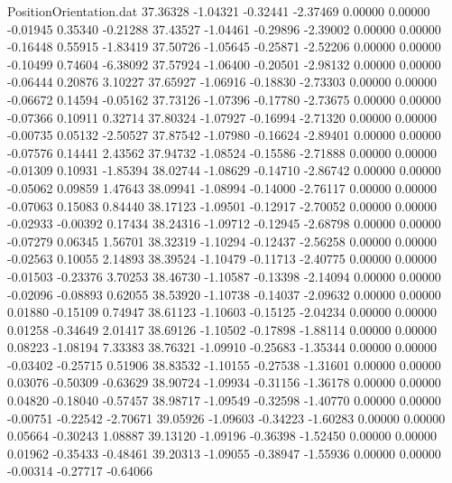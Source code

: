 \begin{filecontents}{PositionOrientation.dat}
  37.36328   -1.04321   -0.32441    -2.37469    0.00000    0.00000   -0.01945    0.35340   -0.21288
  37.43527   -1.04461   -0.29896    -2.39002    0.00000    0.00000   -0.16448    0.55915   -1.83419
  37.50726   -1.05645   -0.25871    -2.52206    0.00000    0.00000   -0.10499    0.74604   -6.38092
  37.57924   -1.06400   -0.20501    -2.98132    0.00000    0.00000   -0.06444    0.20876    3.10227
  37.65927   -1.06916   -0.18830    -2.73303    0.00000    0.00000   -0.06672    0.14594   -0.05162
  37.73126   -1.07396   -0.17780    -2.73675    0.00000    0.00000   -0.07366    0.10911    0.32714
  37.80324   -1.07927   -0.16994    -2.71320    0.00000    0.00000   -0.00735    0.05132   -2.50527
  37.87542   -1.07980   -0.16624    -2.89401    0.00000    0.00000   -0.07576    0.14441    2.43562
  37.94732   -1.08524   -0.15586    -2.71888    0.00000    0.00000   -0.01309    0.10931   -1.85394
  38.02744   -1.08629   -0.14710    -2.86742    0.00000    0.00000   -0.05062    0.09859    1.47643
  38.09941   -1.08994   -0.14000    -2.76117    0.00000    0.00000   -0.07063    0.15083    0.84440
  38.17123   -1.09501   -0.12917    -2.70052    0.00000    0.00000   -0.02933   -0.00392    0.17434
  38.24316   -1.09712   -0.12945    -2.68798    0.00000    0.00000   -0.07279    0.06345    1.56701
  38.32319   -1.10294   -0.12437    -2.56258    0.00000    0.00000   -0.02563    0.10055    2.14893
  38.39524   -1.10479   -0.11713    -2.40775    0.00000    0.00000   -0.01503   -0.23376    3.70253
  38.46730   -1.10587   -0.13398    -2.14094    0.00000    0.00000   -0.02096   -0.08893    0.62055
  38.53920   -1.10738   -0.14037    -2.09632    0.00000    0.00000    0.01880   -0.15109    0.74947
  38.61123   -1.10603   -0.15125    -2.04234    0.00000    0.00000    0.01258   -0.34649    2.01417
  38.69126   -1.10502   -0.17898    -1.88114    0.00000    0.00000    0.08223   -1.08194    7.33383
  38.76321   -1.09910   -0.25683    -1.35344    0.00000    0.00000   -0.03402   -0.25715    0.51906
  38.83532   -1.10155   -0.27538    -1.31601    0.00000    0.00000    0.03076   -0.50309   -0.63629
  38.90724   -1.09934   -0.31156    -1.36178    0.00000    0.00000    0.04820   -0.18040   -0.57457
  38.98717   -1.09549   -0.32598    -1.40770    0.00000    0.00000   -0.00751   -0.22542   -2.70671
  39.05926   -1.09603   -0.34223    -1.60283    0.00000    0.00000    0.05664   -0.30243    1.08887
  39.13120   -1.09196   -0.36398    -1.52450    0.00000    0.00000    0.01962   -0.35433   -0.48461
  39.20313   -1.09055   -0.38947    -1.55936    0.00000    0.00000   -0.00314   -0.27717   -0.64066

\end{filecontents}
